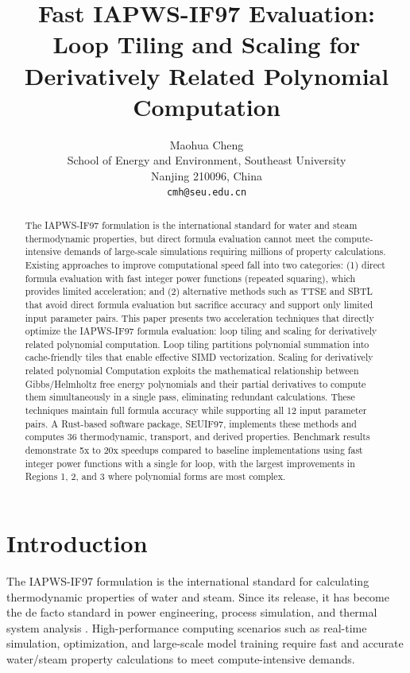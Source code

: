 \documentclass{article}
\title{Fast IAPWS-IF97 Evaluation: Loop Tiling and  Scaling for Derivatively Related Polynomial Computation}
\author{Maohua Cheng \\
  School of Energy and Environment, Southeast University \\
  Nanjing 210096, China \\
  \texttt{cmh@seu.edu.cn}}
\date{}
\begin{document}
\maketitle

\begin{abstract}
The IAPWS-IF97 formulation is the international standard for water and steam thermodynamic properties, 
but direct formula evaluation cannot meet the compute-intensive demands of large-scale simulations requiring millions of
 property calculations. Existing approaches to improve computational speed fall into two categories: 
 (1) direct formula evaluation with fast integer power functions (repeated squaring), which provides limited acceleration; and
  (2) alternative methods such as TTSE and SBTL that avoid direct formula evaluation but sacrifice accuracy and support only limited 
  input parameter pairs. This paper presents two acceleration techniques that directly optimize the IAPWS-IF97 formula evaluation:
   loop tiling and scaling for derivatively related polynomial computation. 
   Loop tiling partitions polynomial summation into cache-friendly tiles  that enable effective SIMD vectorization. 
   Scaling for derivatively related polynomial Computation exploits the mathematical relationship between Gibbs/Helmholtz free energy polynomials and their partial derivatives to compute them simultaneously in a single pass, eliminating redundant calculations. These techniques maintain full formula accuracy while supporting all 12 input parameter pairs. A Rust-based software package, SEUIF97, implements these methods and computes 36 thermodynamic, transport, and derived properties. Benchmark results demonstrate 5x to 20x speedups compared to baseline implementations using fast integer power functions with a single for loop, with the largest improvements in Regions 1, 2, and 3 where polynomial forms are most complex.
\end{abstract}

\section{Introduction}

The IAPWS-IF97 formulation \cite{IAPWS-IF97} is the international standard for calculating thermodynamic properties of water and steam. Since its release, it has become the de facto standard in power engineering, process simulation, and thermal system analysis \cite{Wagner2008}. High-performance computing scenarios such as real-time simulation, optimization, and large-scale model training require fast and accurate water/steam property calculations to meet compute-intensive demands.
\end{document}
